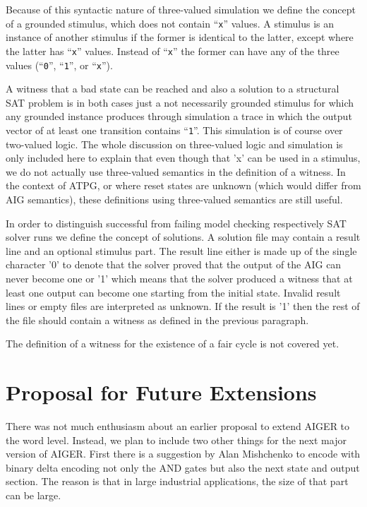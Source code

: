 \documentclass[10pt]{llncs}
\begin{document}
  Because of this syntactic nature of three-valued simulation we define the
  concept of a grounded stimulus, which does not contain ``\texttt{x}'' values.
  A stimulus is an instance of another stimulus if the former is identical
  to the latter, except where the latter has ``\texttt{x}'' values.  Instead of
  ``\texttt{x}'' the
  former can have any of the three values (``\texttt{0}'', ``\texttt{1}'', or ``\texttt{x}'').

  A witness that a bad state can be reached and also a solution to a
  structural SAT problem is in both cases just a not necessarily grounded
  stimulus for which any grounded instance produces through simulation a
  trace in which the output vector of at least one transition contains
  ``\texttt{1}''.
  This simulation is of course over two-valued logic.  The whole discussion
  on three-valued logic and simulation is only included here to explain that
  even though that 'x' can be used in a stimulus, we do not actually use
  three-valued semantics in the definition of a witness.  In the context
  of ATPG, or where reset states are unknown (which would differ from AIG
  semantics), these definitions using three-valued semantics are still
  useful.

  In order to distinguish successful from failing model checking
  respectively SAT solver runs we define the concept of solutions.  A
  solution file may contain a result line and an optional stimulus part.
  The result line either is made up of the single character '0' to denote
  that the solver proved that the output of the AIG can never become one or
  '1' which means that the solver produced a witness that at least one
  output can become one starting from the initial state.  Invalid result
  lines or empty files are interpreted as unknown.  If the result is '1'
  then the rest of the file should contain a witness as defined in the
  previous paragraph.

  The definition of a witness for the existence of a fair cycle is not
  covered yet.

\section{Proposal for Future Extensions}

  There was not much enthusiasm about an earlier proposal to extend AIGER to
  the word level.  Instead, we plan to include two other things for the next
  major version of AIGER.  First there is a suggestion by Alan Mishchenko to
  encode with binary delta encoding not only the AND gates but also the next
  state and output section.  The reason is that in large industrial
  applications, the size of that part can be large.
  
\end{document}
